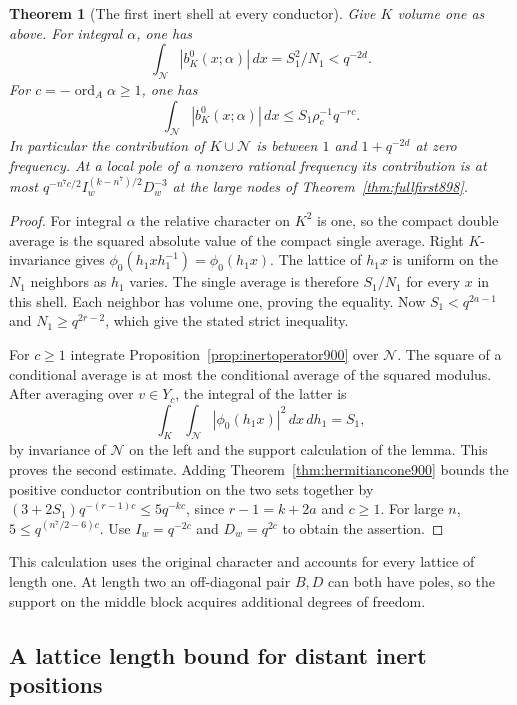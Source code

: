\documentclass[a4paper,11pt]{article}
\newtheorem{theorem}[proposition]{Theorem}
\theoremstyle{definition}
\theoremstyle{remark}
\numberwithin{equation}{section}
\begin{document}
\begin{theorem}[The first inert shell at every conductor]
\leavevmode\label{thm:inertneighbor901}
Give \(K\) volume one as above. For integral \(\alpha\), one has
\[
             \int_{\mathcal N}|b^0_K(x;\alpha)|\,dx
                        = S_1^2/N_1 < q^{-2d}.
\]
For \(c=-\operatorname{ord}_A\alpha\ge1\), one has
\[
       \int_{\mathcal N}|b^0_K(x;\alpha)|\,dx
                     \le S_1\rho_c^{-1}q^{-rc}.
\]
In particular the contribution of \(K\cup\mathcal N\) is between
\(1\) and \(1+q^{-2d}\) at zero frequency. At a local pole of a
nonzero rational frequency its contribution is at most
\(q^{-n^7c/2}I_w^{(k-n^7)/2}D_w^{-3}\) at the large nodes of
Theorem~\ref{thm:fullfirst898}.
\end{theorem}
\begin{proof}
For integral \(\alpha\) the relative character on \(K^2\) is one,
so the compact double average is the squared absolute value
of the compact single average. Right \(K\)-invariance gives
\(\phi_0(h_1xh_1^{-1})=\phi_0(h_1x)\). The lattice of \(h_1x\)
is uniform on the \(N_1\) neighbors as \(h_1\) varies. The
single average is therefore \(S_1/N_1\) for every \(x\) in this
shell. Each neighbor has volume one, proving the equality.
Now \(S_1<q^{2a-1}\) and \(N_1\ge q^{2r-2}\), which give the
stated strict inequality.

For \(c\ge1\) integrate Proposition~\ref{prop:inertoperator900}
over \(\mathcal N\). The square of a conditional average is at
most the conditional average of the squared modulus. After
averaging over \(v\in Y_c\), the integral of the latter is
\[
     \int_K\int_{\mathcal N}|\phi_0(h_1 x)|^2\,dx\,dh_1=S_1,
\]
by invariance of \(\mathcal N\) on the left and the support
calculation of the lemma. This proves the second estimate.
Adding Theorem~\ref{thm:hermitiancone900} bounds the positive
conductor contribution on the two sets together by
\((3+2S_1)q^{-(r-1)c}\le5q^{-kc}\), since \(r-1=k+2a\)
and \(c\ge1\). For large \(n\), \(5\le q^{(n^7/2-6)c}\).
Use \(I_w=q^{-2c}\) and \(D_w=q^{2c}\) to obtain the assertion.
\end{proof}

This calculation uses the original character and accounts for every
lattice of length one. At length two an off-diagonal pair \(B,D\)
can both have poles, so the support on the middle block acquires
additional degrees of freedom.
\clearpage

\subsection{A lattice length bound for distant inert positions}
\label{sec:inertlength902}
\end{document}
